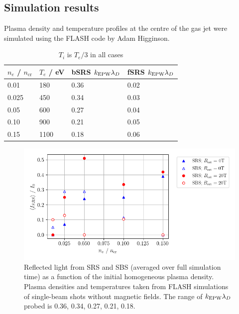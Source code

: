 \subsection{Simulation results}

Plasma density and temperature profiles at the centre of the gas jet were simulated using the FLASH code by Adam Higginson. 

\begin{table}[h]
\begin{center}

\begin{tabular}{|l|l|l|l|}
\hline
$n_e$ / $n_{\mathrm{cr}}$ & $T_e$ / eV & bSRS $k_\mathrm{EPW}\lambda_D$ & fSRS $k_\mathrm{EPW}\lambda_D$\\ \hline \hline
0.01 & 180 & 0.36 & 0.02 \\ \hline
0.025& 450 & 0.34 & 0.03 \\ \hline
0.05 & 600 & 0.27 & 0.04 \\ \hline
0.10 & 900 & 0.21 &  0.05\\ \hline
0.15 & 1100 & 0.18 & 0.06 \\ \hline

\end{tabular}

\end{center}
\caption{$T_i$ is $T_e/3$ in all cases}
\label{tab:LULI_setup}
\end{table}


\begin{figure}[ht]
   \centering
    \includegraphics[width=\columnwidth]{Chapters/C6_magSRS/LULI_sims_v3.png}
    \caption{Reflected light from SRS and SBS (averaged over full simulation time) as a function of the initial homogeneous plasma density. Plasma densities and temperatures taken from FLASH simulations of single-beam shots without magnetic fields. The range of $k_\mathrm{EPW}\lambda_D$ probed is 0.36, 0.34, 0.27, 0.21, 0.18.}
    \label{fig:LULI_sims_v3}
\end{figure}{}

